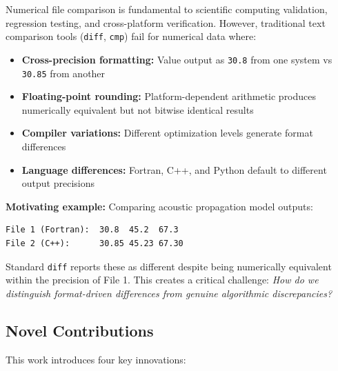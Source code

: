 \documentclass[11pt,letterpaper]{article}
\begin{document}
Numerical file comparison is fundamental to scientific computing validation, regression testing, and cross-platform verification. However, traditional text comparison tools (\texttt{diff}, \texttt{cmp}) fail for numerical data where:

\begin{itemize}
    \item \textbf{Cross-precision formatting:} Value output as \texttt{30.8} from one system vs \texttt{30.85} from another
    \item \textbf{Floating-point rounding:} Platform-dependent arithmetic produces numerically equivalent but not bitwise identical results
    \item \textbf{Compiler variations:} Different optimization levels generate format differences
    \item \textbf{Language differences:} Fortran, C++, and Python default to different output precisions
\end{itemize}

\noindent\textbf{Motivating example:} Comparing acoustic propagation model outputs:
\begin{verbatim}
File 1 (Fortran):  30.8  45.2  67.3
File 2 (C++):      30.85 45.23 67.30
\end{verbatim}

Standard \texttt{diff} reports these as different despite being numerically equivalent within the precision of File 1. This creates a critical challenge: \emph{How do we distinguish format-driven differences from genuine algorithmic discrepancies?}

\subsection{Novel Contributions}

This work introduces four key innovations:
\end{document}
